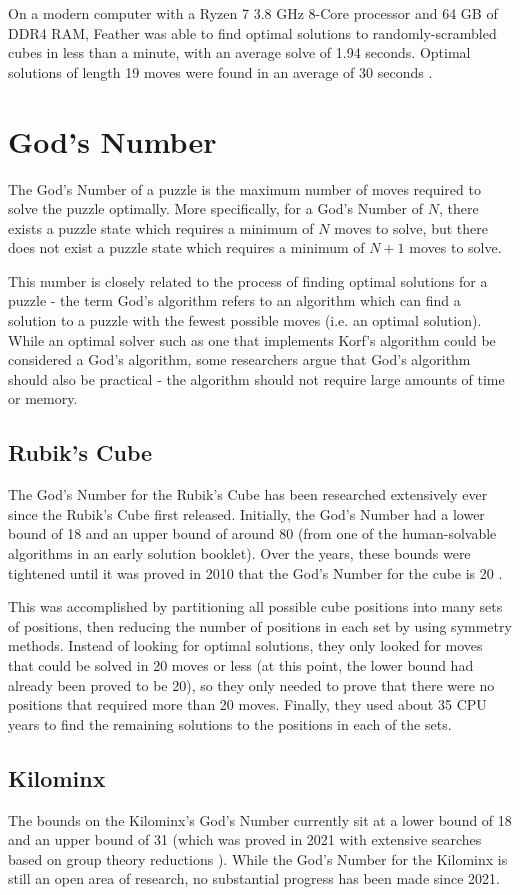 On a modern computer with a Ryzen 7 3.8 GHz 8-Core processor and 64 GB of DDR4 RAM, Feather was able to find optimal solutions to randomly-scrambled cubes in less than a minute, with an average solve of 1.94 seconds. Optimal solutions of length 19 moves were found in an average of 30 seconds \cite{featherperformance}.

\section{God's Number}
The God's Number of a puzzle is the maximum number of moves required to solve the puzzle optimally. More specifically, for a God's Number of $N$, there exists a puzzle state which requires a minimum of $N$ moves to solve, but there does not exist a puzzle state which requires a minimum of $N+1$ moves to solve.

This number is closely related to the process of finding optimal solutions for a puzzle - the term God's algorithm refers to an algorithm which can find a solution to a puzzle with the fewest possible moves (i.e. an optimal solution). While an optimal solver such as one that implements Korf's algorithm could be considered a God's algorithm, some researchers argue \cite{godsalgorithm} that God's algorithm should also be practical - the algorithm should not require large amounts of time or memory.

\subsection{Rubik's Cube}
The God's Number for the Rubik's Cube has been researched extensively ever since the Rubik's Cube first released. Initially, the God's Number had a lower bound of 18 and an upper bound of around 80 (from one of the human-solvable algorithms in an early solution booklet). Over the years, these bounds were tightened until it was proved in 2010 that the God's Number for the cube is 20 \cite{godsnumber}.

This was accomplished by partitioning all possible cube positions into many sets of positions, then reducing the number of positions in each set by using symmetry methods. Instead of looking for optimal solutions, they only looked for moves that could be solved in 20 moves or less (at this point, the lower bound had already been proved to be 20), so they only needed to prove that there were no positions that required more than 20 moves. Finally, they used about 35 CPU years to find the remaining solutions to the positions in each of the sets.

\subsection{Kilominx}
The bounds on the Kilominx's God's Number currently sit at a lower bound of 18 and an upper bound of 31 \cite{kilominxgodsnumber} (which was proved in 2021 with extensive searches based on group theory reductions \cite{kilominxgodsnumberproof}). While the God's Number for the Kilominx is still an open area of research, no substantial progress has been made since 2021. 
